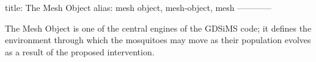title: The Mesh Object
alias: mesh object, mesh-object, mesh
------------


The Mesh Object is one of the central engines of the GDSiMS code; it defines the environment through which the mosquitoes may move as their population evolves as a result of the proposed intervention.
%
%
%
%
%
%
%
%
